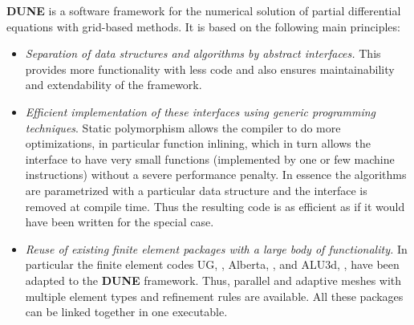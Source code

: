 \documentclass[11pt,a4paper,headinclude,footinclude,DIV16,headings=normal]{scrreprt}
\newcommand{\Dune}{{\sffamily\bfseries DUNE}\xspace}
\begin{document}
\Dune{} is a software framework for the numerical solution of partial
differential equations with grid-based methods. It is based on the
following main principles:
\begin{itemize}
\item \textit{Separation of data structures and
algorithms by abstract interfaces.} This provides more functionality
with less code and also ensures maintainability and
extendability of the framework.
\item \textit{Efficient implementation of these
interfaces using generic programming techniques}. Static polymorphism
allows the compiler to do more optimizations, in particular function
inlining, which in turn allows the interface to have very small
functions (implemented by one or few machine instructions) without a
severe performance penalty. In essence the algorithms are parametrized
with a particular data structure and the interface is removed at
compile time. Thus the resulting code is as efficient as if it would
have been written for the special case.
\item \textit{Reuse of existing finite element packages with a large body of
functionality.} In particular the finite element codes UG, \cite{ug},
Alberta, \cite{Alberta}, and ALU3d, \cite{ALU3d}, have been
adapted to the \Dune{} framework. Thus, parallel and adaptive meshes with
multiple element types and refinement rules are available. All these
packages can be linked together in one executable.
\end{itemize}
\end{document}
